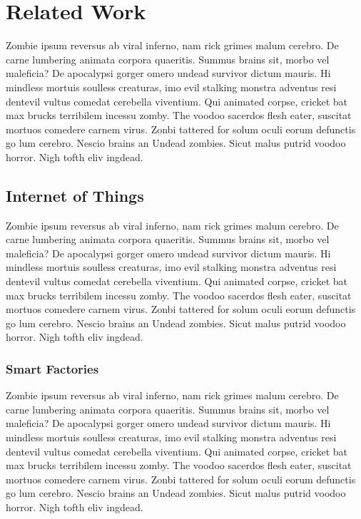 \chapter{Related Work}
Zombie ipsum reversus ab viral inferno, nam rick grimes malum cerebro.
De carne lumbering animata corpora quaeritis.
Summus brains sit, morbo vel maleficia?
De apocalypsi gorger omero undead survivor dictum mauris. Hi mindless mortuis soulless creaturas, imo evil stalking monstra adventus resi dentevil vultus comedat cerebella viventium.
Qui animated corpse, cricket bat max brucks terribilem incessu zomby.
The voodoo sacerdos flesh eater, suscitat mortuos comedere carnem virus.
Zonbi tattered for solum oculi eorum defunctis go lum cerebro.
Nescio brains an Undead zombies.
Sicut malus putrid voodoo horror.
Nigh tofth eliv ingdead.

\section{Internet of Things}
Zombie ipsum reversus ab viral inferno, nam rick grimes malum cerebro.
De carne lumbering animata corpora quaeritis.
Summus brains sit, morbo vel maleficia?
De apocalypsi gorger omero undead survivor dictum mauris. Hi mindless mortuis soulless creaturas, imo evil stalking monstra adventus resi dentevil vultus comedat cerebella viventium.
Qui animated corpse, cricket bat max brucks terribilem incessu zomby.
The voodoo sacerdos flesh eater, suscitat mortuos comedere carnem virus.
Zonbi tattered for solum oculi eorum defunctis go lum cerebro.
Nescio brains an Undead zombies.
Sicut malus putrid voodoo horror.
Nigh tofth eliv ingdead.

\subsection{Smart Factories}
Zombie ipsum reversus ab viral inferno, nam rick grimes malum cerebro.
De carne lumbering animata corpora quaeritis.
Summus brains sit, morbo vel maleficia?
De apocalypsi gorger omero undead survivor dictum mauris. Hi mindless mortuis soulless creaturas, imo evil stalking monstra adventus resi dentevil vultus comedat cerebella viventium.
Qui animated corpse, cricket bat max brucks terribilem incessu zomby.
The voodoo sacerdos flesh eater, suscitat mortuos comedere carnem virus.
Zonbi tattered for solum oculi eorum defunctis go lum cerebro.
Nescio brains an Undead zombies.
Sicut malus putrid voodoo horror.
Nigh tofth eliv ingdead.

